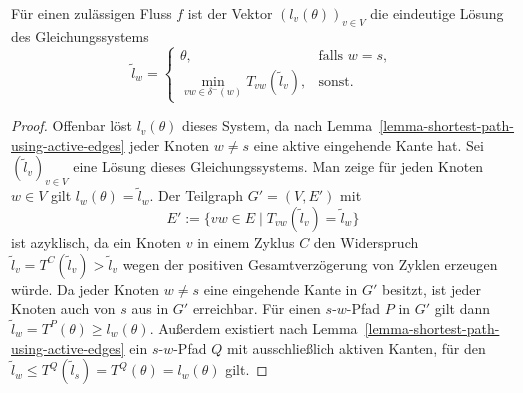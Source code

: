 \begin{proposition}\label{prop-arrival-times-vector}
	Für einen zulässigen Fluss $f$ ist der Vektor $(l_v(\theta))_{v\in V}$ die eindeutige Lösung des Gleichungssystems
	$$ \tilde{l}_w = \begin{cases}
	\theta, & \text{falls } w=s, \\
	\min\limits_{vw\in \delta^-(w)} T_{vw}(\tilde{l}_v), & \text{sonst}.
	\end{cases}$$
\end{proposition}
\begin{proof}
	Offenbar löst $l_v(\theta)$ dieses System, da nach Lemma~\ref{lemma-shortest-path-using-active-edges} jeder Knoten $w\neq s$ eine aktive eingehende Kante hat.
	Sei $(\tilde{l}_v)_{v\in V}$ eine Lösung dieses Gleichungssystems.
	Man zeige für jeden Knoten $w\in V$ gilt $l_w(\theta) = \tilde{l}_w$.
	Der Teilgraph $G'=(V, E')$ mit
	$$E' := \{ vw \in E \mid T_{vw}(\tilde{l}_v ) = \tilde{l}_w \}$$
	ist azyklisch,
	da ein Knoten $v$ in einem Zyklus $C$ den Widerspruch $\tilde{l}_v = T^C(\tilde{l}_v) > \tilde{l}_v$ wegen der positiven Gesamtverzögerung von Zyklen erzeugen würde.
	Da jeder Knoten $w\neq s$ eine eingehende Kante in $G'$ besitzt, ist jeder Knoten auch von $s$ aus in $G'$ erreichbar.
	Für einen $s$-$w$-Pfad $P$ in $G'$ gilt dann $\tilde{l}_w = T^P(\theta) \geq l_w(\theta)$.
	Außerdem existiert nach Lemma~\ref{lemma-shortest-path-using-active-edges} ein $s$-$w$-Pfad $Q$ mit ausschließlich aktiven Kanten, für den $\tilde{l}_w \leq T^Q(\tilde{l}_s) = T^Q(\theta) = l_w(\theta)$ gilt.
\end{proof}
